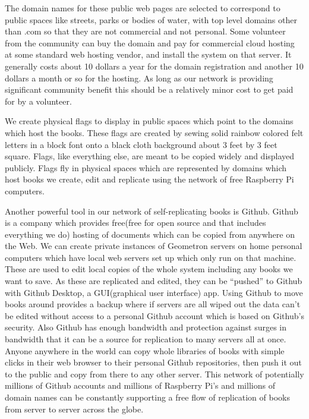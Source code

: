 The domain names for these public web pages are selected to correspond
to public spaces like streets, parks or bodies of water, with top level
domains other than .com so that they are not commercial and not
personal. Some volunteer from the community can buy the domain and pay
for commercial cloud hosting at some standard web hosting vendor, and
install the system on that server. It generally costs about 10 dollars a
year for the domain registration and another 10 dollars a month or so
for the hosting. As long as our network is providing significant
community benefit this should be a relatively minor cost to get paid for
by a volunteer.

We create physical flags to display in public spaces which point to the
domains which host the books. These flags are created by sewing solid
rainbow colored felt letters in a block font onto a black cloth
background about 3 feet by 3 feet square. Flags, like everything else,
are meant to be copied widely and displayed publicly. Flags fly in
physical spaces which are represented by domains which host books we
create, edit and replicate using the network of free Raspberry Pi
computers.

Another powerful tool in our network of self-replicating books is
Github. Github is a company which provides free(free for open source and
that includes everything we do) hosting of documents which can be copied
from anywhere on the Web. We can create private instances of Geometron
servers on home personal computers which have local web servers set up
which only run on that machine. These are used to edit local copies of
the whole system including any books we want to save. As these are
replicated and edited, they can be ``pushed'' to Github with Github
Desktop, a GUI(graphical user interface) app. Using Github to move books
around provides a backup where if servers are all wiped out the data
can't be edited without access to a personal Github account which is
based on Github's security. Also Github has enough bandwidth and
protection against surges in bandwidth that it can be a source for
replication to many servers all at once. Anyone anywhere in the world
can copy whole libraries of books with simple clicks in their web
browser to their personal Github repositories, then push it out to the
public and copy from there to any other server. This network of
potentially millions of Github accounts and millions of Raspberry Pi's
and millions of domain names can be constantly supporting a free flow of
replication of books from server to server across the globe.


